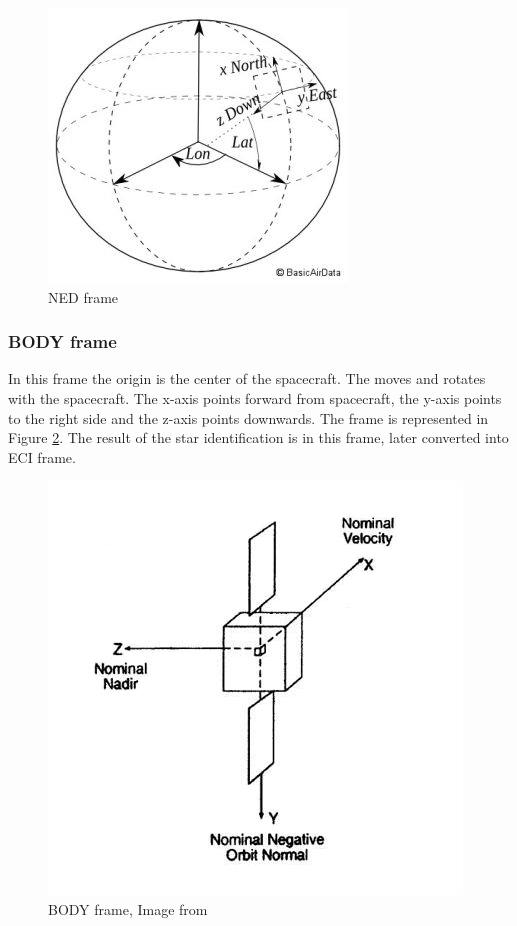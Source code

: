 \documentclass[12pt,a4paper,twoside]{article}
\begin{document}
\begin{figure}[!htb]
\includegraphics[scale=0.6]{ned_frame.jpg}
\centering
\caption[NED frame]{NED frame\cite{ned-frame-image}}
\label{fig:ned_frame}
\end{figure}

\subsubsection{BODY frame}
In this frame the origin is the center of the spacecraft. The moves and rotates with the spacecraft. The x-axis points forward from spacecraft, the y-axis points to the right side and the z-axis points downwards. The frame is represented in Figure \ref{fig:body_frame}. The result of the star identification is in this frame, later converted into ECI frame.

\begin{figure}[!htb]
\includegraphics[scale=0.5]{body_frame.jpg}
\centering
\caption[BODY frame]{BODY frame, Image from \citet{larson1992space}}
\label{fig:body_frame}
\end{figure}
\end{document}
